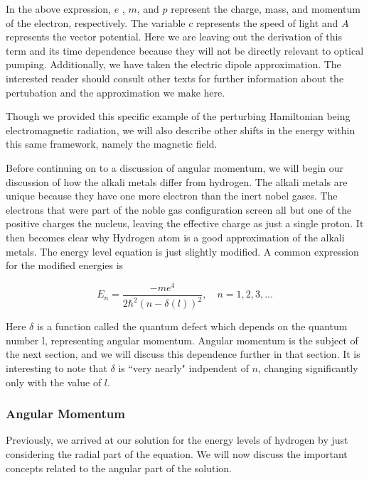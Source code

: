 \documentclass[letter,12pt]{article}
\begin{document}
		In the above expression, $e$ , $m$, and $p$ represent the charge, mass,
		and momentum of the electron, respectively. The variable $c$ represents
		the speed of light and $A$ represents the vector potential. 
		Here we are leaving out the derivation of this term and
		its time dependence because they will not be directly 
		relevant to optical pumping. Additionally, we have taken
		the electric dipole approximation. The interested reader should
		consult other texts for further information about the 
		pertubation and the approximation we make here. 

        Though we provided this specific example of the perturbing 
        Hamiltonian being electromagnetic radiation, we will also 
        describe other shifts in the energy within this same framework,
        namely the magnetic field.

		Before continuing on to a discussion of angular momentum, 
		we will begin our discussion of how the alkali metals differ
		from hydrogen. The alkali metals are unique because they have
        one more electron than the inert nobel gases. 
        The electrons that were part of the noble gas configuration 
        screen all but one of the positive charges the nucleus, leaving the effective
        charge as just a single proton. It then becomes clear why Hydrogen 
        atom is a good approximation of the alkali metals. 
        The energy level equation is just slightly modified. A common
        expression for the modified energies is

		\begin{equation}
            E_n=\frac{-me^4}{2\hbar^2(n-\delta(l))^2},\quad n=1,2,3,...
		\end{equation}

        Here $\delta$ is a function called the quantum defect which
        depends on the quantum number l, representing angular momentum.
        Angular momentum is the subject of the next section, and we 
        will discuss this dependence further in that section.
        It is interesting to note that $\delta$ is ``very nearly"
        indpendent of $n$, changing significantly only with 
        the value of $l$.

		\subsubsection{Angular Momentum}
        Previously, we arrived at our solution for the energy levels
        of hydrogen by just considering the radial part of the
        equation. We will now discuss the important concepts related
        to the angular part of the solution. 
        
\end{document}

